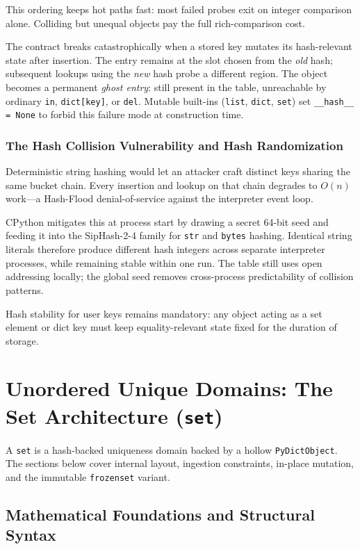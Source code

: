 \documentclass[a4paper,twoside]{report}
\begin{document}
This ordering keeps hot paths fast: most failed probes exit on integer comparison alone. Colliding but unequal objects pay the full rich-comparison cost.

The contract breaks catastrophically when a stored key mutates its hash-relevant state after insertion. The entry remains at the slot chosen from the \emph{old} hash; subsequent lookups using the \emph{new} hash probe a different region. The object becomes a permanent \emph{ghost entry}: still present in the table, unreachable by ordinary \texttt{in}, \texttt{dict[key]}, or \texttt{del}. Mutable built-ins (\texttt{list}, \texttt{dict}, \texttt{set}) set \texttt{\_\_hash\_\_ = None} to forbid this failure mode at construction time.

\subsubsection{The Hash Collision Vulnerability and Hash Randomization}

Deterministic string hashing would let an attacker craft distinct keys sharing the same bucket chain. Every insertion and lookup on that chain degrades to $O(n)$ work---a Hash-Flood denial-of-service against the interpreter event loop.

CPython mitigates this at process start by drawing a secret 64-bit seed and feeding it into the SipHash-2-4 family for \texttt{str} and \texttt{bytes} hashing. Identical string literals therefore produce different hash integers across separate interpreter processes, while remaining stable within one run. The table still uses open addressing locally; the global seed removes cross-process predictability of collision patterns.

Hash stability for user keys remains mandatory: any object acting as a set element or dict key must keep equality-relevant state fixed for the duration of storage.


\section{Unordered Unique Domains: The Set Architecture (\texttt{set})}

A \texttt{set} is a hash-backed uniqueness domain backed by a hollow \texttt{PyDictObject}. The sections below cover internal layout, ingestion constraints, in-place mutation, and the immutable \texttt{frozenset} variant.


\subsection{Mathematical Foundations and Structural Syntax}
\end{document}
